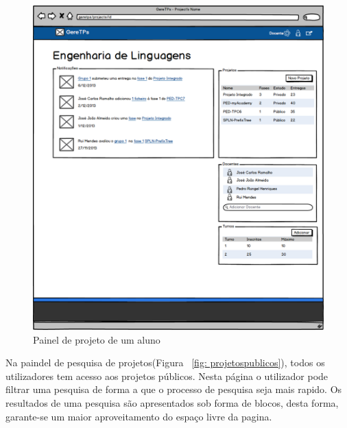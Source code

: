 \begin{figure}[htbp]
        \centering
        \includegraphics[width=1\textwidth]{images/prototipos/mockups/cursodocente.png}
         \caption{Painel de projeto de um aluno}
         \label{fig: cursodocente}
\end{figure}

Na paindel de pesquisa de projetos(Figura ~\ref{fig: projetospublicos}), todos os utilizadores tem acesso aos projetos públicos. Nesta página o utilizador pode filtrar uma pesquisa de forma a que o processo de pesquisa seja mais rapido. Os resultados de uma pesquisa são apresentados sob forma de blocos, desta forma, garante-se um maior aproveitamento do espaço livre da pagina.\\

